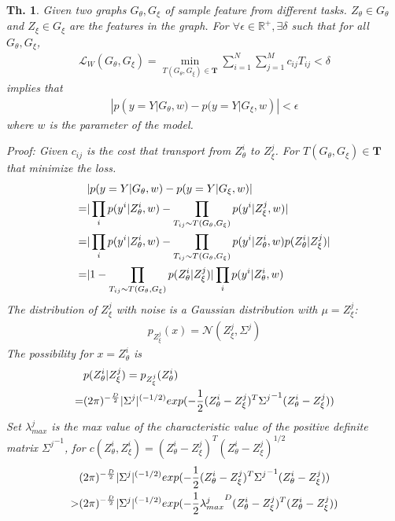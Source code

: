 \documentclass[10pt,journal,compsoc]{IEEEtran}
\newtheorem{theorem}{Th.}[section]  %
\begin{document}
\begin{theorem}
Given two graphs $G_\theta, G_\xi$ of sample feature from different tasks. ${Z_\theta} \in G_\theta$ and ${Z_\xi} \in G_\xi$ are the features in the graph. For $\forall \epsilon \in \mathbb{R}^+, \exists \delta$ such that for all $G_\theta, G_\xi$, 
\begin{align}
    \mathcal{L}_{W}(G_\theta,G_\xi)= \min_{T(G_\theta,G_\xi)\in\mathbf{T}}\sum_{i=1}^N\sum_{j=1}^M c_{ij}T_{ij}<\delta
\end{align}
implies that
\begin{align}
    |p(y=Y|G_\theta,w) - p(y=Y|G_\xi,w)|<\epsilon
\end{align}
where $w$ is the parameter of the model.

\textit{Proof}: Given $c_{ij}$ is the cost that transport from $Z_\theta^i$ to $Z_\xi^j$. For $T(G_\theta,G_\xi)\in\mathbf{T}$ that minimize the loss.
\begin{align}
    &|p(y=Y|G_\theta,w) - p(y=Y|G_\xi,w)| \notag\\
    =&|\prod_i p(y^i|Z_\theta^i,w) - \prod_{T_{ij}\sim T(G_\theta,G_\xi)} p(y^i|Z_\xi^j,w)| \notag\\
    =&|\prod_i p(y^i|Z_\theta^i,w) - \prod_{T_{ij}\sim T(G_\theta,G_\xi)} p(y^i|Z_\theta^i,w)p(Z_\theta^i|Z_\xi^j)| \notag\\
    =&|1-\prod_{T_{ij}\sim T(G_\theta,G_\xi)} p(Z_\theta^i|Z_\xi^j)|\prod_i p(y^i|Z_\theta^i,w)
\end{align}
The distribution of $Z_\xi^j$ with noise is a Gaussian distribution \cite{GPML} with $\mu = Z_\xi^j$:
\begin{align}
    p_{Z_\xi^j}(x)= \mathcal{N}(Z_\xi^j,\Sigma^j)
\end{align}
The possibility for $x = Z_\theta^i$ is
\begin{align}
    &p(Z_\theta^i|Z_\xi^j)
    =p_{Z_\xi^j}(Z_\theta^i)\notag\\
    =&(2\pi)^{-\frac{D}{2}}|{\Sigma^j}|^{(-1/2)}exp(-\frac{1}{2}(Z_\theta^i-Z_\xi^j)^T{\Sigma^j}^{-1}(Z_\theta^i-Z_\xi^j))
\end{align}
Set $\lambda^j_{max}$ is the max value of the characteristic value of the positive definite matrix ${\Sigma^j}^{-1}$, for $c(Z_\theta^i,Z_\xi^i)=(Z_\theta^i-Z_\xi^j)^T(Z_\theta^i-Z_\xi^j)^{1/2}$
\begin{align}
     &(2\pi)^{-\frac{D}{2}}|{\Sigma^j}|^{(-1/2)}exp(-\frac{1}{2}(Z_\theta^i-Z_\xi^j)^T{\Sigma^j}^{-1}(Z_\theta^i-Z_\xi^j)) \notag \\
     > &(2\pi)^{-\frac{D}{2}}|{\Sigma^j}|^{(-1/2)}exp(-\frac{1}{2}{\lambda^j_{max}}^{D}(Z_\theta^i-Z_\xi^j)^T(Z_\theta^i-Z_\xi^j)) \notag\\

\end{align}
\end{theorem}
\end{document}
